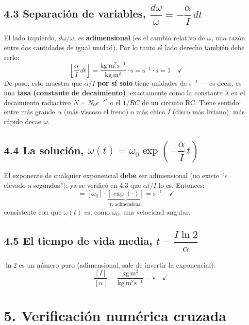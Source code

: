 \documentclass[11pt]{article}
\begin{document}
\subsection*{4.3 Separaci\'on de variables, $\dfrac{d\omega}{\omega}=-\dfrac{\alpha}{I}\,dt$}
El lado izquierdo, $d\omega/\omega$, es \textbf{adimensional} (es el cambio relativo
de $\omega$, una raz\'on entre dos cantidades de igual unidad). Por lo tanto el lado
derecho tambi\'en debe serlo:
\begin{equation}
\left[\frac{\alpha}{I}\,dt\right] = \frac{\text{kg}\,\text{m}^2\text{s}^{-1}}
{\text{kg}\,\text{m}^2}\cdot\text{s} = \text{s}^{-1}\cdot\text{s} = 1\quad\checkmark
\end{equation}
De paso, esto muestra que $\alpha/I$ \textbf{por s\'i solo} tiene unidades de
s$^{-1}$ --- es decir, es una \textbf{tasa (constante de decaimiento)}, exactamente
como la constante $\lambda$ en el decaimiento radiactivo $N=N_0e^{-\lambda t}$ o el
$1/RC$ de un circuito RC. Tiene sentido: entre m\'as grande $\alpha$ (m\'as viscoso
el freno) o m\'as chico $I$ (disco m\'as liviano), m\'as r\'apido decae $\omega$.

\subsection*{4.4 La soluci\'on, $\omega(t)=\omega_0\exp\!\left(-\dfrac{\alpha}{I}\,t
\right)$}
El exponente de cualquier exponencial \textbf{debe} ser adimensional (no existe
``$e$ elevado a segundos''); ya se verific\'o en 4.3 que $\alpha t/I$ lo es. Entonces:
\begin{equation}
[\omega(t)] = [\omega_0]\cdot\underbrace{[\exp(\cdot)]}_{1,\ \text{adimensional}}
= \text{s}^{-1}\quad\checkmark
\end{equation}
consistente con que $\omega(t)$ es, como $\omega_0$, una velocidad angular.

\subsection*{4.5 El tiempo de vida media, $t=\dfrac{I\ln 2}{\alpha}$}
$\ln 2$ es un n\'umero puro (adimensional, sale de invertir la exponencial):
\begin{equation}
[t] = \frac{[I]}{[\alpha]} = \frac{\text{kg}\,\text{m}^2}{\text{kg}\,\text{m}^2
\text{s}^{-1}} = \text{s}\quad\checkmark
\end{equation}

\section*{5. Verificaci\'on num\'erica cruzada}
\end{document}
